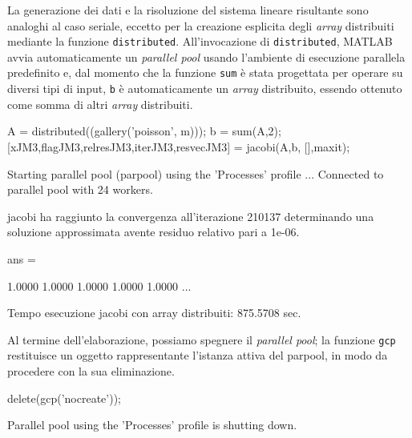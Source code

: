 La generazione dei dati e la risoluzione del sistema lineare risultante sono analoghi al caso seriale, eccetto per la creazione esplicita degli \textit{array}
distribuiti mediante la funzione \lstinline{distributed}.\newline
All'invocazione di \lstinline{distributed}, MATLAB avvia automaticamente un \textit{parallel pool} usando l'ambiente di esecuzione parallela predefinito e, dal momento che la funzione \lstinline{sum} \`e stata progettata per operare su diversi tipi di input, \lstinline{b} \`e automaticamente un \textit{array} distribuito, essendo
ottenuto come somma di altri \textit{array} distribuiti.
\begin{matlabcode}
    A = distributed((gallery('poisson', m)));
    b = sum(A,2);
    [xJM3,flagJM3,relresJM3,iterJM3,resvecJM3] = jacobi(A,b,
                                                 [],maxit);
\end{matlabcode}
\begin{matlaboutput}
    Starting parallel pool (parpool) using the 'Processes' 
    profile ...
    Connected to parallel pool with 24 workers.

    jacobi ha raggiunto la convergenza all'iterazione 210137
    determinando una soluzione approssimata avente residuo
    relativo pari a 1e-06.
\end{matlaboutput}
\begin{matlaboutput}
    ans =

    1.0000    1.0000    1.0000    1.0000    1.0000    ...

    Tempo esecuzione jacobi con array distribuiti: 875.5708 sec.
\end{matlaboutput}
Al termine dell'elaborazione, possiamo spegnere il \textit{parallel pool}; la funzione \lstinline{gcp} restituisce un oggetto rappresentante l'istanza attiva del parpool, in modo da procedere con la sua eliminazione.
\begin{matlabcode}
    delete(gcp('nocreate'));
\end{matlabcode}
\begin{matlaboutput}
    Parallel pool using the 'Processes' profile is shutting down.
\end{matlaboutput}
